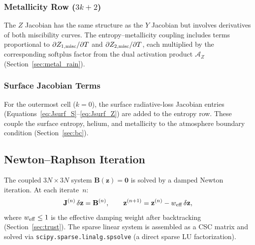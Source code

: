 \documentclass{aastex631}
\newcommand{\pp}{\partial}
\newcommand{\softplus}{\mathrm{softplus}}
\begin{document}
\subsubsection{Metallicity Row ($3k+2$)}\label{sec:jac_metal}

The $Z$ Jacobian has the same structure as the $Y$ Jacobian but
involves derivatives of both miscibility curves.  The
entropy--metallicity coupling includes terms proportional to
$\pp Z_{1,{\rm misc}}/\pp T$ and $\pp Z_{2,{\rm misc}}/\pp T$,
each multiplied by the corresponding $\softplus$ factor from the
dual activation product $\mathcal{A}_Z$
(Section~\ref{sec:metal_rain}).

\subsubsection{Surface Jacobian Terms}

For the outermost cell ($k=0$), the surface radiative-loss Jacobian
entries (Equations~\ref{eq:Jsurf_S}--\ref{eq:Jsurf_Z}) are added to
the entropy row.  These couple the surface entropy, helium, and
metallicity to the atmosphere boundary condition
(Section~\ref{sec:bc}).

\subsection{Newton--Raphson Iteration}\label{sec:newton}

The coupled $3N\times 3N$ system $\mathbf{B}(\mathbf{z})=\mathbf{0}$ is
solved by a damped Newton iteration.  At each iterate~$n$:
\begin{equation}\label{eq:NR}
  \mathbf{J}^{(n)}\,\delta\mathbf{z}
  = \mathbf{B}^{(n)},
  \qquad
  \mathbf{z}^{(n+1)}
  = \mathbf{z}^{(n)} - w_{\rm eff}\,\delta\mathbf{z},
\end{equation}
where $w_{\rm eff}\le 1$ is the effective damping weight after
backtracking (Section~\ref{sec:trust}).  The sparse linear system is
assembled as a CSC matrix and solved via
\texttt{scipy.sparse.linalg.spsolve} (a direct sparse LU
factorization).
\end{document}
